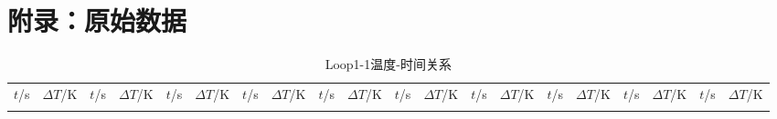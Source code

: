 \section*{\quad 附录：原始数据}

{\tiny

\begin{longtable}{cc|cc|cc|cc|cc|cc|cc|cc|cc|cc}
\toprule
\endhead

\caption{Loop1-1温度-时间关系}\\
\toprule
$t$/\si{s} & $\Delta T$/\si{K} & $t$/\si{s} & $\Delta T$/\si{K} & $t$/\si{s} & $\Delta T$/\si{K} & $t$/\si{s} & $\Delta T$/\si{K} & $t$/\si{s} & $\Delta T$/\si{K} & $t$/\si{s} & $\Delta T$/\si{K} & $t$/\si{s} & $\Delta T$/\si{K} & $t$/\si{s} & $\Delta T$/\si{K} & $t$/\si{s} & $\Delta T$/\si{K} & $t$/\si{s} & $\Delta T$/\si{K} \\
\midrule
\endfirsthead

\bottomrule
\endfoot

\bottomrule
\endlastfoot


\end{longtable}}
